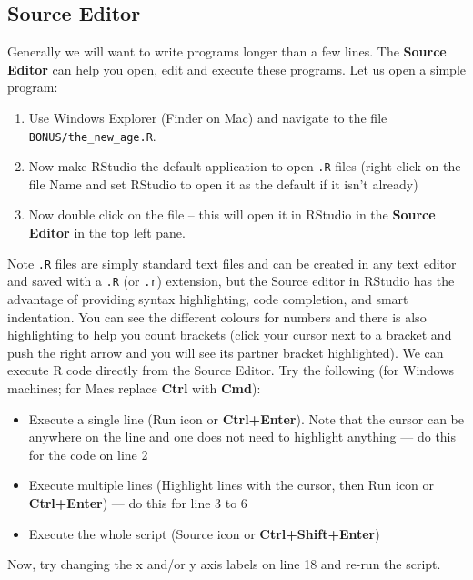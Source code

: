 \documentclass[]{book}
\providecommand{\tightlist}{%
  \setlength{\itemsep}{0pt}\setlength{\parskip}{0pt}}
\theoremstyle{definition}
\theoremstyle{definition}
\theoremstyle{definition}
\theoremstyle{remark}
\begin{document}
\subsection{Source Editor}\label{source-editor}

Generally we will want to write programs longer than a few lines. The
\textbf{Source Editor} can help you open, edit and execute these
programs. Let us open a simple program:

\begin{enumerate}
\def\labelenumi{\arabic{enumi}.}
\item
  Use Windows Explorer (Finder on Mac) and navigate to the file
  \texttt{BONUS/the\_new\_age.R}.
\item
  Now make RStudio the default application to open \texttt{.R} files
  (right click on the file Name and set RStudio to open it as the
  default if it isn't already)
\item
  Now double click on the file -- this will open it in RStudio in the
  \textbf{Source Editor} in the top left pane.
\end{enumerate}

Note \texttt{.R} files are simply standard text files and can be created
in any text editor and saved with a \texttt{.R} (or \texttt{.r})
extension, but the Source editor in RStudio has the advantage of
providing syntax highlighting, code completion, and smart indentation.
You can see the different colours for numbers and there is also
highlighting to help you count brackets (click your cursor next to a
bracket and push the right arrow and you will see its partner bracket
highlighted). We can execute R code directly from the Source Editor. Try
the following (for Windows machines; for Macs replace \textbf{Ctrl} with
\textbf{Cmd}):

\begin{itemize}
\tightlist
\item
  Execute a single line (Run icon or \textbf{Ctrl+Enter}). Note that the
  cursor can be anywhere on the line and one does not need to highlight
  anything --- do this for the code on line 2
\item
  Execute multiple lines (Highlight lines with the cursor, then Run icon
  or \textbf{Ctrl+Enter}) --- do this for line 3 to 6
\item
  Execute the whole script (Source icon or \textbf{Ctrl+Shift+Enter})
\end{itemize}

Now, try changing the x and/or y axis labels on line 18 and re-run the
script.
\end{document}
